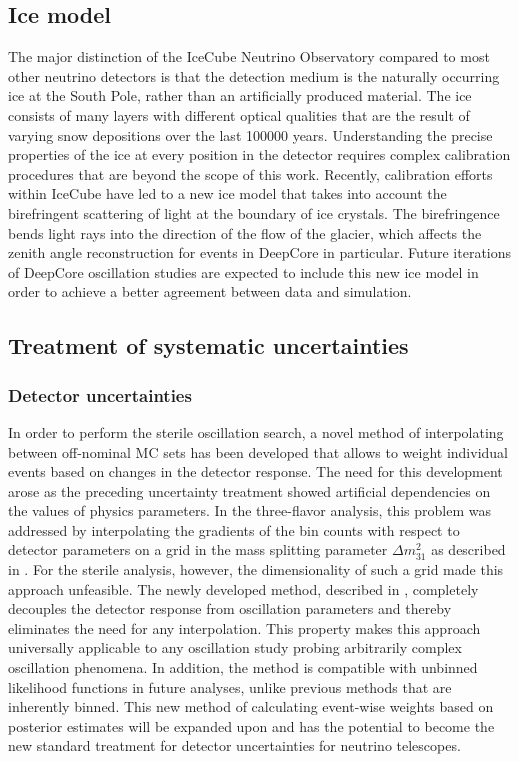 \subsection{Ice model}
The major distinction of the IceCube Neutrino Observatory compared to most other neutrino detectors is that the detection medium is the naturally occurring ice at the South Pole, rather than an artificially produced material. The ice consists of many layers with different optical qualities that are the result of varying snow depositions over the last \num{100000} years. Understanding the precise properties of the ice at every position in the detector requires complex calibration procedures that are beyond the scope of this work. Recently, calibration efforts within IceCube have led to a new ice model that takes into account the birefringent scattering of light at the boundary of ice crystals. The birefringence bends light rays into the direction of the flow of the glacier, which affects the zenith angle reconstruction for events in DeepCore in particular. Future iterations of DeepCore oscillation studies are expected to include this new ice model in order to achieve a better agreement between data and simulation.

\subsection{Treatment of systematic uncertainties}
\subsubsection{Detector uncertainties}
In order to perform the sterile oscillation search, a novel method of interpolating between off-nominal MC sets has been developed that allows to weight individual events based on changes in the detector response. The need for this development arose as the preceding uncertainty treatment showed artificial dependencies on the values of physics parameters. In the three-flavor analysis, this problem was addressed by interpolating the gradients of the bin counts with respect to detector parameters on a grid in the mass splitting parameter $\Delta m^2_{31}$ as described in . For the sterile analysis, however, the dimensionality of such a grid made this approach unfeasible. The newly developed method, described in , completely decouples the detector response from oscillation parameters and thereby eliminates the need for any interpolation. This property makes this approach universally applicable to any oscillation study probing arbitrarily complex oscillation phenomena. In addition, the method is compatible with unbinned likelihood functions in future analyses, unlike previous methods that are inherently binned. This new method of calculating event-wise weights based on posterior estimates will be expanded upon and has the potential to become the new standard treatment for detector uncertainties for neutrino telescopes.

